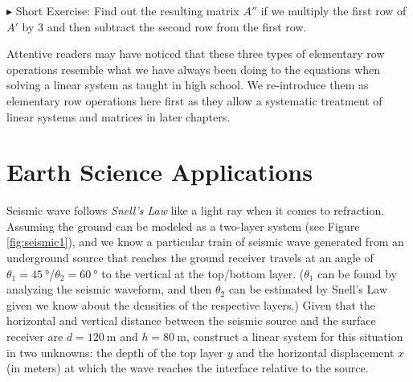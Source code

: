 $\blacktriangleright$ Short Exercise: Find out the resulting matrix $A''$ if we multiply the first row of $A'$ by $3$ and then subtract the second row from the first row.\footnotemark\par
Attentive readers may have noticed that these three types of elementary row operations resemble what we have always been doing to the equations when solving a linear system as taught in high school. We re-introduce them as elementary row operations here first as they allow a systematic treatment of linear systems and matrices in later chapters.

\section{Earth Science Applications}
\label{section:ch1earth}
\begin{exmp}
\label{exmp:seismic1}
Seismic wave follows \textit{Snell's Law} like a light ray when it comes to refraction. Assuming the ground can be modeled as a two-layer system (see Figure \ref{fig:seismic1}), and we know a particular train of seismic wave generated from an underground source that reaches the ground receiver travels at an angle of $\theta_1 = \SI{45}{\degree}$/$\theta_2 = \SI{60}{\degree}$ to the vertical at the top/bottom layer. ($\theta_1$ can be found by analyzing the seismic waveform, and then $\theta_2$ can be estimated by Snell's Law given we know about the densities of the respective layers.) Given that the horizontal and vertical distance between the seismic source and the surface receiver are $d = \SI{120}{\m}$ and $h = \SI{80}{\m}$, construct a linear system for this situation in two unknowns: the depth of the top layer $y$ and the horizontal displacement $x$ (in meters) at which the wave reaches the interface relative to the source.
\end{exmp}
